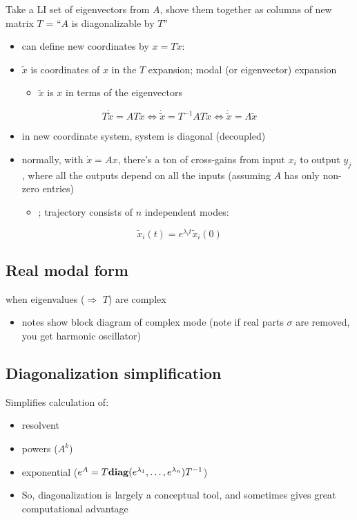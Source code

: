 \documentclass[10pt,letterpaper]{article}
\begin{document}
Take a LI set of eigenvectors from $A$, shove them together as columns of new matrix $T$ = ``$A$ is diagonalizable by $T$''
\begin{itemize}
\item can define new coordinates by $x=T \tilde x$:
\item $\tilde x$ is coordinates of $x$ in the $T$ expansion; modal (or eigenvector) expansion

\begin{itemize}
\item $\tilde x$ is $x$ in terms of the eigenvectors
\end{itemize}

\end{itemize}
$$
T \dot{\tilde x}=AT \tilde x \Leftrightarrow \dot{ \tilde x}= T ^{-1} AT \tilde x \Leftrightarrow \dot{ \tilde x} = \Lambda \tilde x
$$
\begin{itemize}
\item in new coordinate system, system is diagonal (decoupled)
\item normally, with $\dot x=Ax$, there's a ton of cross-gains from input $x_i$ to output $y_j$, where all the outputs depend on all the inputs (assuming $A$ has only non-zero entries)

\begin{itemize}
\item {}; trajectory consists of $n$ independent modes:
\end{itemize}

\end{itemize}
$$
\tilde x_i (t) = e ^{\lambda_i t} \tilde x _{i} (0)
$$
\subsection{Real modal form}
\label{sec-11_7}

when eigenvalues ($\Rightarrow$ $T$) are complex
\begin{itemize}
\item notes show block diagram of complex mode (note if real parts $\sigma$ are removed, you get harmonic oscillator)
\end{itemize}
\subsection{Diagonalization simplification}
\label{sec-11_8}

Simplifies calculation of:
\begin{itemize}
\item resolvent
\item powers ($A^k$)
\item exponential ($e ^{A}=T {\bf diag} (e ^{\lambda_1},\dots, e ^{\lambda_n}) T ^{-1}$)
\item So, diagonalization is largely a conceptual tool, and sometimes gives great computational advantage
\end{itemize}
\end{document}
